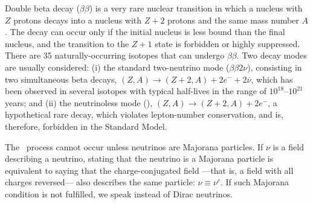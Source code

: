 Double beta decay ($\beta\beta$) is a very rare nuclear transition in which a nucleus with $Z$ protons decays into a nucleus with $Z + 2$ protons and the same mass number $A$. The decay can occur only if the initial nucleus is less bound than the final nucleus, and the transition to the $Z+1$ state is forbidden or highly suppressed. There are 35 naturally-occurring isotopes that can undergo $\beta\beta$. Two decay modes are usually considered: (i) the standard two-neutrino mode ($\beta\beta2\nu$), consisting in two simultaneous beta decays, $(Z,A) \rightarrow (Z + 2,A) + 2 e^- +2\overline{\nu}$, which has been observed in several isotopes with typical half-lives in the range of $10^{18}$--$10^{21}$ years; and (ii) the neutrinoless mode (\bbonu), $(Z,A) \rightarrow (Z +2, A) + 2 e^-$, a hypothetical rare decay, which violates lepton-number conservation, and is, therefore, forbidden in the Standard Model.

The \bbonu\ process cannot occur unless neutrinos are Majorana particles. 
%
%
%
%
If $\nu$ is a field describing a neutrino, stating that the neutrino is a Majorana particle is equivalent to saying that the charge-conjugated field ---\thinspace that is, a field with all charges reversed\thinspace--- also describes the same particle: $\nu\equiv\nu^c$. If such Majorana condition is not fulfilled, we speak instead of Dirac neutrinos. 

